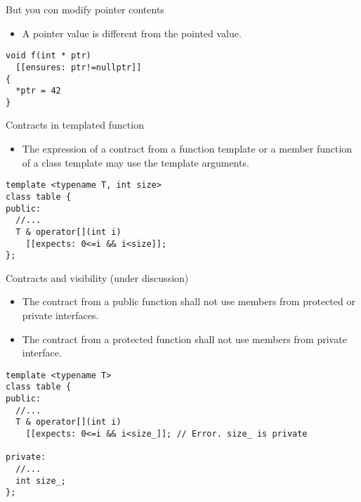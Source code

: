 \begin{frame}[t,fragile]{But you con modify pointer contents}
\begin{itemize}
  \item A pointer value is different from the pointed value.
\end{itemize}

\vfill\pause
\begin{lstlisting}
void f(int * ptr)
  [[ensures: ptr!=nullptr]]
{
  *ptr = 42
}
\end{lstlisting}
\end{frame}

\begin{frame}[t,fragile]{Contracts in templated function}
\begin{itemize}
  \item The expression of a contract from a function template
        or a member function of a class template may use the
        template arguments.
\end{itemize}

\vfill\pause
\begin{lstlisting}
template <typename T, int size>
class table {
public:
  //...
  T & operator[](int i)
    [[expects: 0<=i && i<size]];
};
\end{lstlisting}

\end{frame}

\begin{frame}[t,fragile]{Contracts and visibility (under discussion)}
\begin{itemize}
  \item The contract from a public function shall not use members from protected
or private interfaces.
  \item The contract from a protected function shall not use members from private 
interface.
\end{itemize}

\vfill\pause
\begin{lstlisting}
template <typename T>
class table {
public:
  //...
  T & operator[](int i)
    [[expects: 0<=i && i<size_]]; // Error. size_ is private

private:
  //...
  int size_;
};
\end{lstlisting}
\end{frame}

